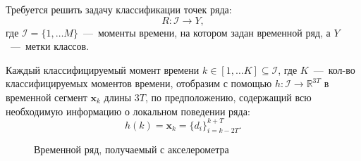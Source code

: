 \documentclass[12pt, twoside]{article}
\begin{document}
Требуется решить задачу классификации точек ряда: $$R:\mathcal{I}\rightarrow Y,$$ где $\mathcal{I}=\{1,\ldots M\}$~---~моменты времени, на котором задан временной ряд, а $Y$~---~метки классов.

Каждый классифицируемый момент времени $k\in [1,\ldots K]\subseteq\mathcal{I}$, где $K$~---~кол-во классифицируемых моментов времени, отобразим с помощью $h:\mathcal{I}\rightarrow \mathds{R}^{3T}$ в временной сегмент $\mathbf{x}_k$ длины $3T$, по предположению, содержащий всю необходимую информацию о локальном поведении ряда:
\begin{equation}\label{eq1}
h(k) = \mathbf{x}_k = \{d_i\}_{i=k-2T}^{k+T}.
\end{equation}

\begin{figure}[H]
\caption{ Временной ряд, получаемый с акселерометра}
\label{fig:image}
\end{figure}
\end{document}
